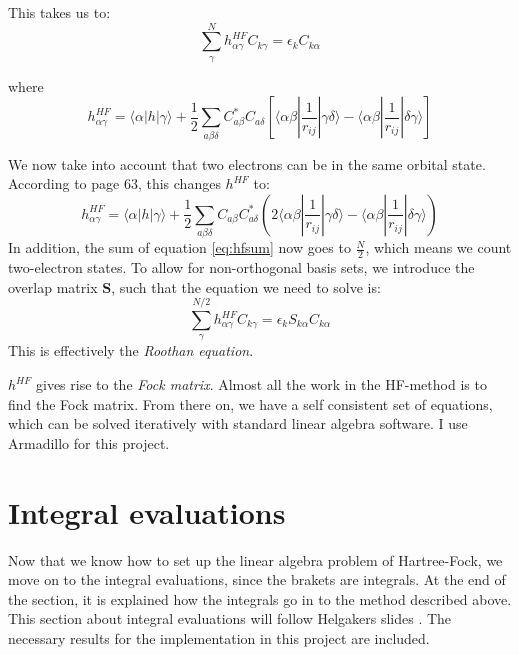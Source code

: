\documentclass[a4paper,10pt, twocolumn, pre]{revtex4}
\newcommand{\mb}{\mathbf}
\newcommand{\sandwich}[3]{\langle {#1}|{#2}|{#3}\rangle}
\begin{document}
This takes us to:
\begin{equation}
	\sum_\gamma^N h_{\alpha\gamma}^{HF} C_{k\gamma} = \epsilon_k C_{k\alpha}
	\label{eq:hfsum}
\end{equation}

where 
\begin{equation}
	h_{\alpha\gamma}^{HF} = \langle \alpha |h|\gamma\rangle + \frac{1}{2}\sum_{a \beta \delta}  C^*_{a\beta}C_{a\delta} \left[ 
	\langle\alpha \beta|\frac{1}{r_{ij}}| \gamma \delta \rangle
	-
	\langle\alpha \beta|\frac{1}{r_{ij}}| \delta \gamma \rangle
	\right]
\end{equation}

We now take into account that two electrons can be in the same orbital state. According to \cite{thijssen2007computational} page 63, this changes $h^{HF}$ to:
\begin{equation}
	h_{\alpha\gamma}^{HF} = \sandwich{\alpha}{h}{\gamma} + \frac{1}{2}\sum_{a\beta\delta} C_{a\beta}C^*_{a\delta} (2\sandwich{\alpha\beta}{\frac{1}{r_{ij}}}{\gamma\delta}-\sandwich{\alpha\beta}{\frac{1}{r_{ij}}}{\delta\gamma} )
\end{equation}
In addition, the sum of equation \ref{eq:hfsum} now goes to $\frac{N}{2}$, which means we count two-electron states. To allow for non-orthogonal basis sets, we introduce the overlap matrix $\mb{S}$, such that the equation we need to solve is:
\begin{equation}
		\sum_\gamma^{N/2} h_{\alpha\gamma}^{HF} C_{k\gamma} = \epsilon_k S_{k\alpha}C_{k\alpha}
	\label{eq:hfsumfinal}
\end{equation}
This is effectively the \emph{Roothan equation}.

$h^{HF}$ gives rise to the \emph{Fock matrix}. Almost all the work in the HF-method is to find the Fock matrix. From there on, we have a self consistent set of equations, which can be solved iteratively with standard linear algebra software. I use Armadillo \cite{Sanderson2011} for this project. 


\section{Integral evaluations}
Now that we know how to set up the linear algebra problem of Hartree-Fock, we move on to the integral evaluations, since the brakets are integrals. At the end of the section, it is explained how the integrals go in to the method described above. 
This section about integral evaluations will follow Helgakers slides \cite{helgaker2006}. The necessary results for the implementation in this project are included. 
\end{document}
